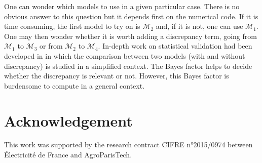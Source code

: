 \documentclass[soumission]{jsfds}
\begin{document}
One can wonder which models to use in a given particular case. There is no obvious answer to this question but it depends first on the numerical code. If it is time consuming, the first model to try on is $\mathcal{M}_2$ and, if it is not, one can use $\mathcal{M}_1$. One may then wonder whether it is worth adding a discrepancy term, going from $\mathcal{M}_1$ to $\mathcal{M}_3$ or from $\mathcal{M}_2$ to $\mathcal{M}_4$. In-depth work on statistical validation had been developed in \citet{damblin2016} in which the comparison between two models (with and without discrepancy) is studied in a simplified context. The Bayes factor helps to decide whether the discrepancy is relevant or not. However, this Bayes factor is burdensome to compute in a general context.




\section{Acknowledgement}
This work was supported by the research contract CIFRE n°2015/0974 between Électricité de France and AgroParisTech.

%



\newpage
\end{document}
